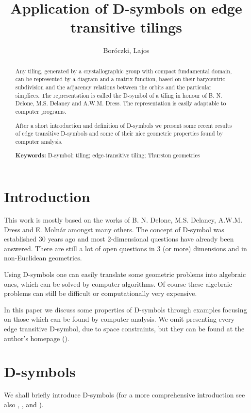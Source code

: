 \documentclass[12pt,a4paper]{article}
\numberwithin{equation}{section}
\theoremstyle{plain}%
\theoremstyle{definition}
\theoremstyle{remark}
\begin{document}
\title{Application of D-symbols on edge transitive tilings}
\author{Boróczki, Lajos}
\maketitle

\begin{abstract}
  Any tiling, generated by a crystallographic group with compact fundamental
  domain, can be represented by a diagram and a matrix function, based on
  their barycentric subdivision and the adjacency relations between the orbits
  and the particular simplices. The representation is called the D-symbol of a
  tiling in honour of B. N. Delone, M.S. Delaney and A.W.M. Dress. The
  representation is easily adaptable to computer programs.

  After a short introduction and definition of D-symbols we 
  present some recent results of edge transitive D-symbols and some of their
  nice geometric properties found by computer analysis.

  {\bf Keywords:} D-symbol; tiling; edge-transitive tiling; Thurston geometries
\end{abstract}

\section{Introduction}
This work is mostly based on the works of B. N. Delone, M.S. Delaney,
A.W.M. Dress and E. Molnár amongst many others. The concept of D-symbol was
established $30$ years ago and most $2$-dimensional questions have already been
answered. There are still a lot of open questions in $3$ (or more) dimensions
and in non-Euclidean geometries.

Using D-symbols one can easily translate some geometric problems into algebraic
ones, which can be solved by computer algorithms. Of course these algebraic
problems can still be difficult or computationally very expensive.

In this paper we discuss some properties of D-symbols through examples focusing
on those which can be found by computer analysis. We omit presenting every edge
transitive D-symbol, due to space constraints, but they can be found at the
author's homepage (\cite{MYHOME_edge_trans}).

\section{D-symbols}
We shall briefly introduce D-symbols (for a more comprehensive introduction see
also \cite{BSzK02}, \cite{DHM93}, \cite{M96} and \cite{M11}). 
\end{document}
